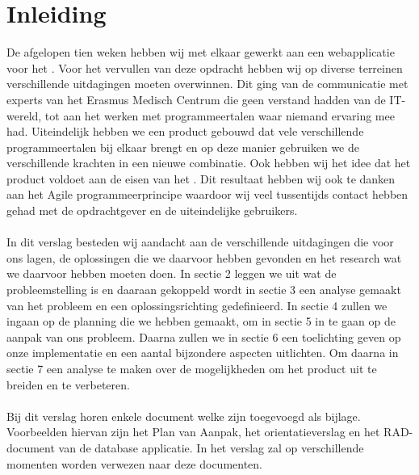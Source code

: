 \section{Inleiding}
\label{inleiding}
De afgelopen tien weken hebben wij met elkaar gewerkt aan een webapplicatie voor het \casamproject. Voor het vervullen van deze opdracht hebben wij op diverse terreinen verschillende uitdagingen moeten overwinnen. Dit ging van de communicatie met experts van het Erasmus Medisch Centrum die geen verstand hadden van de IT-wereld, tot aan het werken met programmeertalen waar niemand ervaring mee had. 
Uiteindelijk hebben we een product gebouwd dat vele verschillende programmeertalen bij elkaar brengt en op deze manier gebruiken we de verschillende krachten in een nieuwe combinatie. Ook hebben wij het idee dat het product voldoet aan de eisen van het \casamproject. Dit resultaat hebben wij ook te danken aan het Agile programmeerprincipe waardoor wij veel tussentijds contact hebben gehad met de opdrachtgever en de uiteindelijke gebruikers.
\\
\\
In dit verslag besteden wij aandacht aan de verschillende uitdagingen die voor ons lagen, de oplossingen die we daarvoor hebben gevonden en het research wat we daarvoor hebben moeten doen. In sectie 2 leggen we uit wat de probleemstelling is en daaraan gekoppeld wordt in sectie 3 een analyse gemaakt van het probleem en een oplossingsrichting gedefinieerd. In sectie 4 zullen we ingaan op de planning die we hebben gemaakt, om in sectie 5 in te gaan op de aanpak van ons probleem. Daarna zullen we in sectie 6 een toelichting geven op onze implementatie en een aantal bijzondere aspecten uitlichten. Om daarna in sectie 7 een analyse te maken over de mogelijkheden om het product uit te breiden en te verbeteren. 
\\
\\
Bij dit verslag horen enkele document welke zijn toegevoegd als bijlage. Voorbeelden hiervan zijn het Plan van Aanpak, het orientatieverslag en het RAD-document van de database applicatie. In het verslag zal op verschillende momenten worden verwezen naar deze documenten. 
